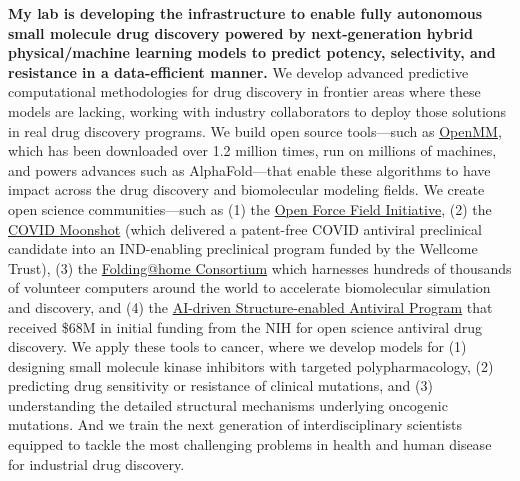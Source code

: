\documentclass[10pt]{article}
\begin{document}

\textbf{My lab is developing the infrastructure to enable fully autonomous small molecule drug discovery powered by next-generation hybrid physical/machine learning models to predict potency, selectivity, and resistance in a data-efficient manner.}
We develop advanced predictive computational methodologies for drug discovery in frontier areas where these models are lacking, working with industry collaborators to deploy those solutions in real drug discovery programs.
We build open source tools---such as \href{http://openmm.org}{OpenMM}, which has been downloaded over 1.2 million times, run on millions of machines, and powers advances such as AlphaFold---that enable these algorithms to have impact across the drug discovery and biomolecular modeling fields.
We create open science communities---such as (1) the \href{http://openforcefield.org}{Open Force Field Initiative}, (2) the \href{http://postera.ai/covid}{COVID Moonshot} (which delivered a patent-free COVID antiviral preclinical candidate into an IND-enabling preclinical program funded by the Wellcome Trust), (3) the \href{https://foldingathome.org/about-2/the-foldinghome-consortium/?lng=en}{Folding@home Consortium} which harnesses hundreds of thousands of volunteer computers around the world to accelerate biomolecular simulation and discovery, and (4) the \href{http://asapdiscovery.org}{AI-driven Structure-enabled Antiviral Program} that received \$68M in initial funding from the NIH for open science antiviral drug discovery.
We apply these tools to cancer, where we develop models for (1) designing small molecule kinase inhibitors with targeted polypharmacology, (2) predicting drug sensitivity or resistance of clinical mutations, and (3) understanding the detailed structural mechanisms underlying oncogenic mutations.
And we train the next generation of interdisciplinary scientists equipped to tackle the most challenging problems in health and human disease for industrial drug discovery.
\end{document}
